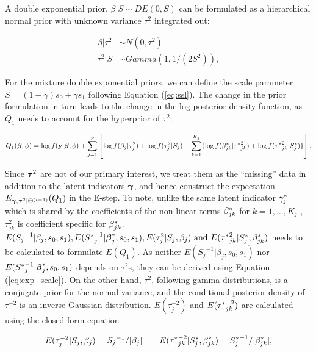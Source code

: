 \documentclass[]{article}
\begin{document}
A double exponential prior, \(\beta|S \sim DE(0, S)\) can be formulated
as a hierarchical normal prior with unknown variance \(\tau^2\)
integrated out:

\begin{align*}
  \beta|\tau^2 &\sim N(0, \tau^2)\\
  \tau^2|S & \sim Gamma(1, 1/(2S^2)), 
\end{align*}

For the mixture double exponential priors, we can define the scale
parameter \(S = (1-\gamma)s_0 + \gamma s_1\) following Equation
(\ref{eq:ssl}). The change in the prior formulation in turn leads to the
change in the log posterior density function, as \(Q_1\) needs to
account for the hyperprior of \(\tau^2\):

\begin{equation}\label{eq:Q1_IWLS}
Q_1(\boldsymbol{\beta}, \phi) = \log f(\textbf{y}|\boldsymbol{\beta}, \phi) + \sum\limits_{j=1}^p\left[\log f(\beta_j|{\tau}^2_j) + \log f({\tau}^2_j| S_j)+\sum\limits_{k=1}^{K_j} \{\log f(\beta^{*}_{jk}|{\tau^{*}}^2_{jk})+\log f({\tau^*}^2_{jk}| S^*_j)\}\right].
\end{equation}

Since \(\boldsymbol{\tau}^2\) are not of our primary interest, we treat them as
the ``missing'' data in addition to the latent indicators
\(\boldsymbol{\gamma}\), and hence construct the expectation
\(E_{\boldsymbol{\gamma}, \boldsymbol{\tau}^2|\Theta^{(t-1)}}(Q_1)\) in the E-step. To
note, unlike the same latent indicator \(\gamma^*_j\) which is shared
by the coefficients of the non-linear terms \(\beta^*_{jk}\) for
\(k = 1, \dots, K_j\) , \(\tau^2_{jk}\) is coefficient specific for
\(\beta^*_{jk}\).
\(E({S_j}^{-1}|\beta_j, s_0, s_1), E({S^*}^{-1}_j|\boldsymbol{\beta}_j^*, s_0, s_1), E({\tau}^2_{j}|S_j, \beta_j) \text{ and } E({\tau^*}^2_{jk}|S_j^*, \beta^*_{jk})\)
needs to be calculated to formulate \(E(Q_1)\). As neither
\(E({S_j}^{-1}|\beta_j, s_0, s_1)\) nor
\(E({S^*}^{-1}_j|\boldsymbol{\beta}_j^*, s_0, s_1)\) depends on \(\tau^2\)s,
they can be derived using Equation (\ref{eq:exp_scale}). On the other
hand, \(\tau^{2}\), following gamma distributions, is a conjugate prior
for the normal variance, and the conditional posterior density of
\(\tau^{-2}\) is an inverse Gaussian distribution.
\(E({\tau}^{-2}_{j})\) and \(E({\tau^*}^{-2}_{jk})\) are calculated
using the closed form equation

\begin{align*}
 E({\tau}^{-2}_{j}|S_j, \beta_j) ={S_j}^{-1}/|\beta_j| \qquad E({\tau^*}^{-2}_{jk}|S_j^*, \beta^*_{jk})={S_j^*}^{-1}/|\beta^*_{jk}|,
\end{align*}
\end{document}
